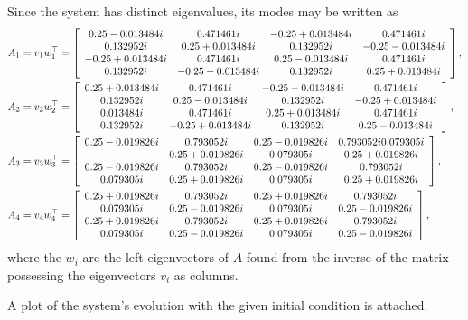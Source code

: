 \documentclass{article}
\begin{document}
\begin{enumerate}[(a)]
{Since the system has distinct eigenvalues, its modes may be written as
\begin{align*}
A_1 = v_1 w_1^\top 
&= \left[\begin{array}{c c c c}
     0.25 - 0.013484i 
   &        0.471461i 
   &-0.25 + 0.013484i
   &        0.471461i \\
            0.132952i
   & 0.25 + 0.013484i
   &        0.132952i
   &-0.25 - 0.013484i \\
    -0.25 + 0.013484i 
   &        0.471461i
   & 0.25 - 0.013484i 
   &        0.471461i \\
            0.132952i 
   &-0.25 - 0.013484i 
   &        0.132952i 
   & 0.25 + 0.013484i
   \end{array}\right], \\
A_2 = v_2 w_2^\top 
&= \left[\begin{array}{c c c c}
     0.25 + 0.013484i 
  &         0.471461i 
  & -0.25 - 0.013484i 
  &         0.471461i \\
            0.132952i 
  &  0.25 - 0.013484i 
  &         0.132952i 
  & -0.25 + 0.013484i \\
            0.013484i 
  &         0.471461i 
  &  0.25 + 0.013484i 
  &         0.471461i \\
            0.132952i 
  & -0.25 + 0.013484i 
  &         0.132952i 
  &  0.25 - 0.013484i
   \end{array}\right], \\
A_3 = v_3 w_3^\top 
&= \left[\begin{array}{c c c c}
    0.25 - 0.019826i 
 &         0.793052i 
 &  0.25 - 0.019826i 
 &         0.793052i
           0.079305i \\
 &  0.25 + 0.019826i 
 &         0.079305i 
 &  0.25 + 0.019826i \\
    0.25 - 0.019826i 
 &         0.793052i 
 &  0.25 - 0.019826i 
 &         0.793052i \\
           0.079305i 
 &  0.25 + 0.019826i 
 &         0.079305i 
 &  0.25 + 0.019826i
   \end{array}\right], \\
A_4 = v_4 w_4^\top 
&= \left[\begin{array}{c c c c}
    0.25 + 0.019826i 
 &         0.793052i 
 &  0.25 + 0.019826i 
 &         0.793052i \\
           0.079305i 
 &  0.25 - 0.019826i 
 &         0.079305i 
 &  0.25 - 0.019826i \\
    0.25 + 0.019826i 
 &         0.793052i 
 &  0.25 + 0.019826i 
 &         0.793052i \\
           0.079305i 
 &  0.25 - 0.019826i 
 &         0.079305i 
 &  0.25 - 0.019826i
   \end{array}\right], \\
\end{align*}
where the $w_i$ are the left eigenvectors of $A$ found from the
inverse of the matrix possessing the eigenvectors $v_i$ as columns.

A plot of the system's evolution with the given initial condition is
attached.
}
\end{enumerate}
\end{document}
